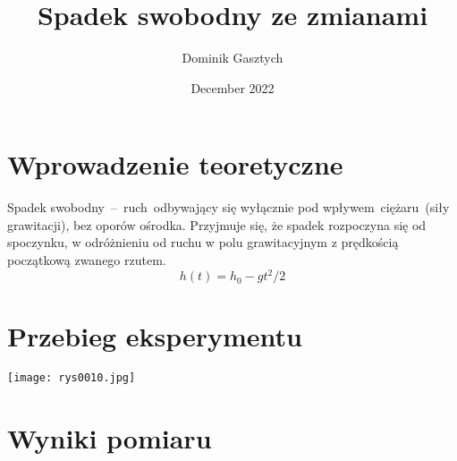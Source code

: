 \documentclass{article}
\title{Spadek swobodny ze zmianami}
\author{Dominik Gasztych}
\date{December 2022}
\begin{document}
\maketitle

\section{Wprowadzenie teoretyczne}
Spadek swobodny – ruch odbywający się wyłącznie pod
wpływem ciężaru (siły grawitacji), bez oporów ośrodka. Przyjmuje się, że spadek
rozpoczyna się od spoczynku, w odróżnieniu od ruchu w polu grawitacyjnym z
prędkością początkową zwanego rzutem.
\begin{equation}
    h(t)=h_0- gt^2/2
\end{equation}

\section{Przebieg eksperymentu}

\begin{center}
\texttt{[image: rys0010.jpg]}
\end{center}

\section{Wyniki pomiaru}
\end{document}
